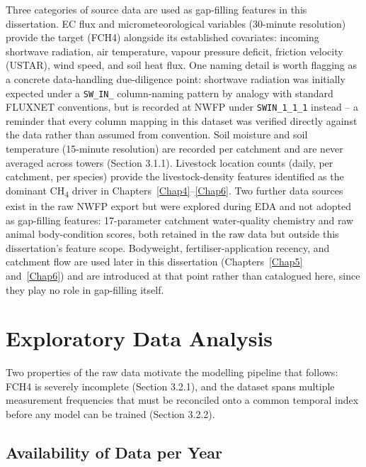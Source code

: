 Three categories of source data are used as gap-filling features in this dissertation. EC flux and
micrometeorological variables (30-minute resolution) provide the target (FCH4) alongside its
established covariates: incoming shortwave radiation, air temperature, vapour pressure deficit,
friction velocity (USTAR), wind speed, and soil heat flux. One naming detail is worth flagging as a
concrete data-handling due-diligence point: shortwave radiation was initially expected under a
\texttt{SW\_IN\_} column-naming pattern by analogy with standard FLUXNET conventions, but is
recorded at NWFP under \texttt{SWIN\_1\_1\_1} instead -- a reminder that every column mapping in
this dataset was verified directly against the data rather than assumed from convention. Soil
moisture and soil temperature (15-minute resolution) are recorded per catchment and are never
averaged across towers (Section 3.1.1). Livestock location counts (daily, per catchment, per
species) provide the livestock-density features identified as the dominant CH\textsubscript{4}
driver in Chapters~\ref{Chap4}--\ref{Chap6}. Two further data sources exist in the raw NWFP export
but were explored during EDA and not adopted as gap-filling features: 17-parameter catchment
water-quality chemistry and raw animal body-condition scores, both retained in the raw data but
outside this dissertation's feature scope. Bodyweight, fertiliser-application recency, and
catchment flow are used later in this dissertation (Chapters~\ref{Chap5} and~\ref{Chap6}) and are
introduced at that point rather than catalogued here, since they play no role in gap-filling itself.

\section{Exploratory Data Analysis}

Two properties of the raw data motivate the modelling pipeline that follows: FCH4 is severely
incomplete (Section 3.2.1), and the dataset spans multiple measurement frequencies that must be
reconciled onto a common temporal index before any model can be trained (Section 3.2.2).

\subsection{Availability of Data per Year}

